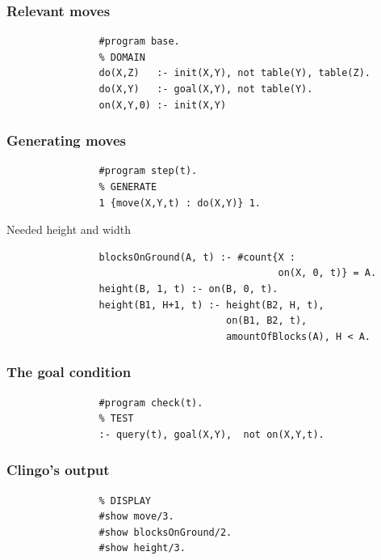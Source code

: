 \documentclass[12pt]{beamer}
\begin{document}
        \begin{frame}[fragile]
            \frametitle{Relevant moves}
            \begin{lstlisting}
                #program base.
                % DOMAIN
                do(X,Z)   :- init(X,Y), not table(Y), table(Z).
                do(X,Y)   :- goal(X,Y), not table(Y).
                on(X,Y,0) :- init(X,Y)
            \end{lstlisting}
        \end{frame} 

        \begin{frame}[fragile]
            \frametitle{Generating moves}
            \begin{lstlisting}
                #program step(t).
                % GENERATE
                1 {move(X,Y,t) : do(X,Y)} 1.
            \end{lstlisting}
        \end{frame}  

        \begin{frame}[fragile]{Needed height and width}
            \small
            \begin{lstlisting}
                blocksOnGround(A, t) :- #count{X :
                                               on(X, 0, t)} = A.
                height(B, 1, t) :- on(B, 0, t).
                height(B1, H+1, t) :- height(B2, H, t),
                                      on(B1, B2, t),
                                      amountOfBlocks(A), H < A.
            \end{lstlisting}
        \end{frame}
        
        \begin{frame}[fragile]
            \frametitle{The goal condition}
            \begin{lstlisting}
                #program check(t).
                % TEST
                :- query(t), goal(X,Y),  not on(X,Y,t).
            \end{lstlisting}
        \end{frame}

        \begin{frame}[fragile]
            \frametitle{Clingo's output}
            \begin{lstlisting}
                % DISPLAY
                #show move/3.
                #show blocksOnGround/2.
                #show height/3.
            \end{lstlisting}
        \end{frame}
    
\end{document}
